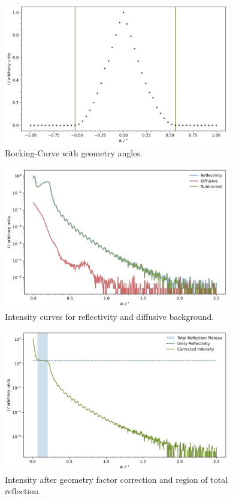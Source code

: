 \begin{figure}[H]
	\centering
	\includegraphics[width=0.88\textwidth]{content/plots/4.jpg}
	\caption{Rocking-Curve with geometry angles.}
	\label{fig:rocking-curve}
\end{figure}

\begin{figure}[H]
	\centering
	\includegraphics[width=0.88\textwidth]{content/plots/5.jpg}
	\caption{Intensity curves for reflectivity and diffusive background.}
	\label{fig:reflex-diffuse}
\end{figure}

\begin{figure}[H]
	\centering
	\includegraphics[width=0.88\textwidth]{content/plots/6.jpg}
	\caption{Intensity after geometry factor correction and region of total reflection.}
	\label{fig:geom-corr}
\end{figure}

